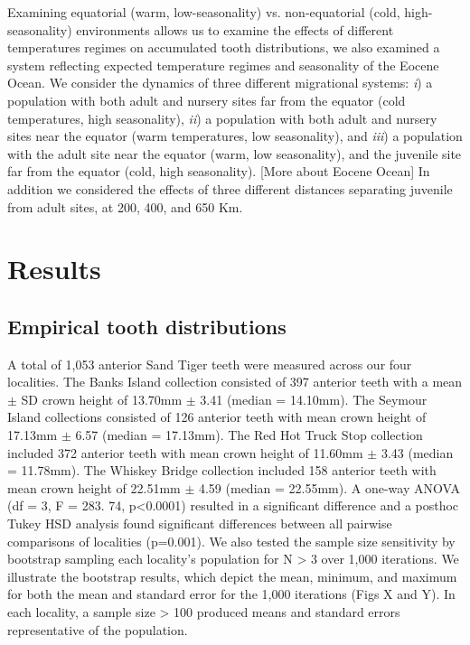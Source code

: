 \documentclass[]{rsos}%
\begin{document}

Examining equatorial (warm, low-seasonality) vs. non-equatorial (cold, high-seasonality) environments allows us to examine the effects of different temperatures regimes on accumulated tooth distributions, we also examined a system reflecting expected temperature regimes and seasonality of the Eocene Ocean.
We consider the dynamics of three different migrational systems: 
\emph{i}) a population with both adult and nursery sites far from the equator (cold temperatures, high seasonality),
\emph{ii}) a population with both adult and nursery sites near the equator (warm temperatures, low seasonality), and
\emph{iii}) a population with the adult site near the equator (warm, low seasonality), and the juvenile site far from the equator (cold, high seasonality).
[More about Eocene Ocean]
In addition we considered the effects of three different distances separating juvenile from adult sites, at 200, 400, and 650 Km.





\section{Results}

\subsection{Empirical tooth distributions}
A total of 1,053 anterior Sand Tiger teeth were measured across our four localities. 
The Banks Island collection consisted of 397 anterior teeth with a mean $\pm$ SD crown height of 13.70mm $\pm$ 3.41 (median = 14.10mm). 
The Seymour Island collections consisted of 126 anterior teeth with mean crown height of 17.13mm $\pm$ 6.57 (median = 17.13mm). 
The Red Hot Truck Stop collection included 372 anterior teeth with mean crown height of 11.60mm $\pm$ 3.43 (median = 11.78mm). 
The Whiskey Bridge collection included 158 anterior teeth with mean crown height of 22.51mm $\pm$ 4.59 (median = 22.55mm). 
A one-way ANOVA (df = 3, F = 283. 74, p<0.0001) resulted in a significant difference and a posthoc Tukey HSD analysis found significant differences between all pairwise comparisons of localities (p=0.001). 
We also tested the sample size sensitivity by bootstrap sampling each locality’s population for N > 3 over 1,000 iterations. 
We illustrate the bootstrap results, which depict the mean, minimum, and maximum for both the mean and standard error for the 1,000 iterations (Figs X and Y). 
In each locality, a sample size > 100 produced means and standard errors representative of the population. 
\end{document}
